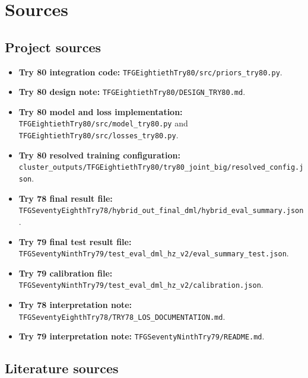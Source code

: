 \documentclass[11pt,a4paper]{article}
\begin{document}
\clearpage
\section{Sources}

\subsection{Project sources}
\small
\begin{itemize}
\item \textbf{Try 80 integration code:}
      \texttt{TFGEightiethTry80/src/priors\_try80.py}.

\item \textbf{Try 80 design note:}
      \texttt{TFGEightiethTry80/DESIGN\_TRY80.md}.

\item \textbf{Try 80 model and loss implementation:}
      \texttt{TFGEightiethTry80/src/model\_try80.py} and
      \texttt{TFGEightiethTry80/src/losses\_try80.py}.

\item \textbf{Try 80 resolved training configuration:}
      \texttt{cluster\_outputs/TFGEightiethTry80/try80\_joint\_big/resolved\_config.json}.

\item \textbf{Try 78 final result file:}
      \texttt{TFGSeventyEighthTry78/hybrid\_out\_final\_dml/hybrid\_eval\_summary.json}.

\item \textbf{Try 79 final test result file:}
      \texttt{TFGSeventyNinthTry79/test\_eval\_dml\_hz\_v2/eval\_summary\_test.json}.

\item \textbf{Try 79 calibration file:}
      \texttt{TFGSeventyNinthTry79/test\_eval\_dml\_hz\_v2/calibration.json}.

\item \textbf{Try 78 interpretation note:}
      \texttt{TFGSeventyEighthTry78/TRY78\_LOS\_DOCUMENTATION.md}.

\item \textbf{Try 79 interpretation note:}
      \texttt{TFGSeventyNinthTry79/README.md}.
\end{itemize}
\normalsize
\subsection{Literature sources}
\end{document}
